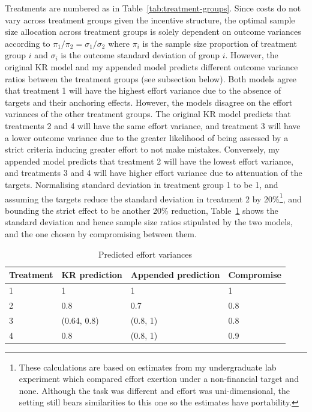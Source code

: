 \documentclass[12pt, letterpaper]{article}
\begin{document}
Treatments are numbered as in Table~\ref{tab:treatment-groups}. Since costs do not vary across treatment groups given the incentive structure, the optimal sample size allocation across treatment groups is solely dependent on outcome variances according to $\pi_1/\pi_2 = \sigma_1/\sigma_2$ where $\pi_i$ is the sample size proportion of treatment group $i$ and $\sigma_i$ is the outcome standard deviation of group $i$. However, the original KR model and my appended model predicts different outcome variance ratios between the treatment groups (see subsection below). Both models agree that treatment 1 will have the highest effort variance due to the absence of targets and their anchoring effects. However, the models disagree on the effort variances of the other treatment groups. The original KR model predicts that treatments 2 and 4 will have the same effort variance, and treatment 3 will have a lower outcome variance due to the greater likelihood of being assessed by a strict criteria inducing greater effort to not make mistakes. Conversely, my appended model predicts that treatment 2 will have the lowest effort variance, and treatments 3 and 4 will have higher effort variance due to attenuation of the targets. Normalising standard deviation in treatment group 1 to be 1, and assuming the targets reduce the standard deviation in treatment 2 by 20\%\footnote{These calculations are based on estimates from my undergraduate lab experiment which compared effort exertion under a non-financial target and none. Although the task was different and effort was uni-dimensional, the setting still bears similarities to this one so the estimates have portability.}, and bounding the strict effect to be another 20\% reduction, Table~\ref{tab:predicted-variance} shows the standard deviation and hence sample size ratios stipulated by the two models, and the one chosen by compromising between them.

\begin{table}[htbp]
\centering
\caption{Predicted effort variances}\label{tab:predicted-variance}
\begin{tabular}{@{}llll@{}}
\toprule
Treatment & KR prediction & Appended prediction & Compromise \\
\midrule
1 & 1 & 1 & 1 \\
2 & 0.8 & 0.7 & 0.8 \\
3 & (0.64, 0.8) & (0.8, 1) & 0.8 \\
4 & 0.8 & (0.8, 1) & 0.9 \\
\bottomrule
\end{tabular}
\end{table}
\end{document}
